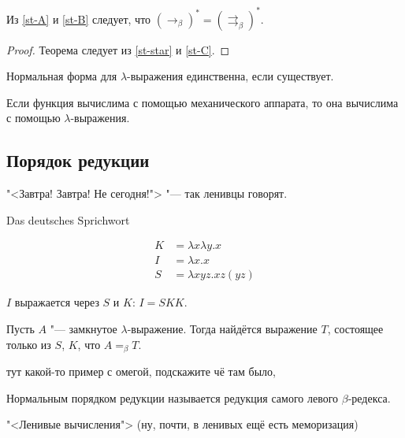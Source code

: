 \begin{statement} \label{st-C}
    Из \ref{st-A} и \ref{st-B} следует, что $(\rightarrow_{\beta})^{*} = (\rightrightarrows_{\beta})^{*}$.
\end{statement}

\begin{proof}
    Теорема  следует из \ref{st-star} и \ref{st-C}.
\end{proof}

\begin{corollary}
    Нормальная форма для $\lambda$-выражения единственна, если существует.
\end{corollary}

\begin{theorem}
    Если функция вычислима с помощью механического аппарата, то она вычислима с помощью $\lambda$-выражения.
\end{theorem}

\subsection{Порядок редукции}
\epigraph{"<Завтра! Завтра! Не сегодня!"> "--- так ленивцы говорят.}{Das deutsches Sprichwort}

\begin{definition}
    \begin{align*}
        K &= \lambda x \lambda y . x \\
        I &= \lambda x . x \\
        S &= \lambda x y z . x z (y z)
    \end{align*}
\end{definition}
$I$ выражается через $S$ и $K$: $I = S K K$.

\begin{statement}
    Пусть $A$ "--- замкнутое $\lambda$-выражение. Тогда найдётся выражение $T$, состоящее только из $S$, $K$, что $A =_{\beta}T$.
\end{statement}

\begin{example}
    тут какой-то пример с омегой, подскажите чё там было, \todo %
\end{example}

\begin{definition}
    Нормальным порядком редукции называется редукция самого левого $\beta$-редекса.
\end{definition}
"<Ленивые вычисления"> (ну, почти, в ленивых ещё есть меморизация)

